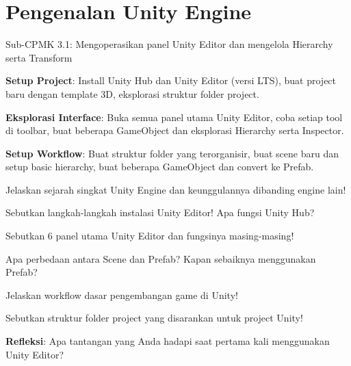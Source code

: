 \documentclass[../main]{subfiles}
\begin{document}
\chapter{Pengenalan Unity Engine}

\begin{subcpmk}
  \item Sub-CPMK 3.1: Mengoperasikan panel Unity Editor dan mengelola Hierarchy serta Transform
\end{subcpmk}







\begin{aktivitas}
  \item \textbf{Setup Project}: Install Unity Hub dan Unity Editor (versi LTS), buat project baru dengan template 3D, eksplorasi struktur folder project.
  
  \item \textbf{Eksplorasi Interface}: Buka semua panel utama Unity Editor, coba setiap tool di toolbar, buat beberapa GameObject dan eksplorasi Hierarchy serta Inspector.
  
  \item \textbf{Setup Workflow}: Buat struktur folder yang terorganisir, buat scene baru dan setup basic hierarchy, buat beberapa GameObject dan convert ke Prefab.
\end{aktivitas}


\begin{latihan}
  \item Jelaskan sejarah singkat Unity Engine dan keunggulannya dibanding engine lain!
  
  \item Sebutkan langkah-langkah instalasi Unity Editor! Apa fungsi Unity Hub?
  
  \item Sebutkan 6 panel utama Unity Editor dan fungsinya masing-masing!
  
  \item Apa perbedaan antara Scene dan Prefab? Kapan sebaiknya menggunakan Prefab?
  
  \item Jelaskan workflow dasar pengembangan game di Unity!
  
  \item Sebutkan struktur folder project yang disarankan untuk project Unity!
  
  \item \textbf{Refleksi}: Apa tantangan yang Anda hadapi saat pertama kali menggunakan Unity Editor?
\end{latihan}
\end{document}
